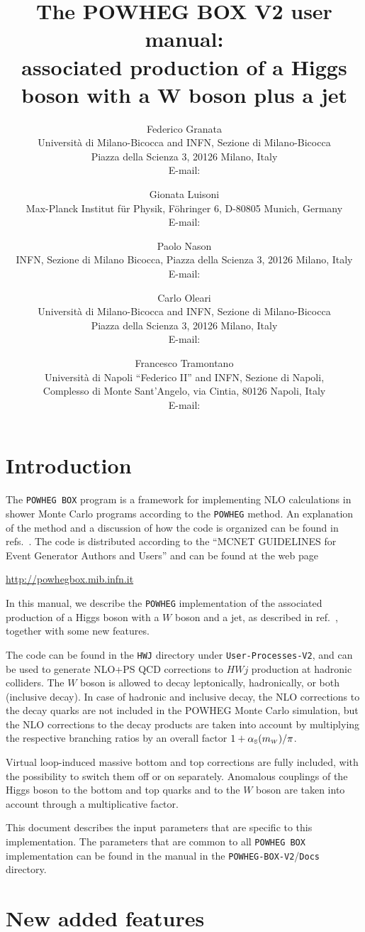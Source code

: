 \documentclass[paper]{JHEP3}
\title{The POWHEG BOX V2 user manual:\\
  associated production of a Higgs boson with a $\boldsymbol{W}$ boson plus a jet} \vfill
\author{Federico Granata\\
  Universit\`a di Milano-Bicocca and INFN, Sezione di Milano-Bicocca\\
  Piazza della Scienza 3, 20126 Milano, Italy\\
  E-mail: \email{federico.granata@mib.infn.it}}
\author{Gionata Luisoni\\ 
  Max-Planck Institut f{\"u}r Physik, F\"ohringer 6, D-80805 Munich, Germany\\
  E-mail: \email{luisonig@mpp.mpg.de}
}
\author{Paolo Nason\\
  INFN, Sezione di Milano Bicocca, Piazza della Scienza 3, 20126 Milano, Italy\\
  E-mail: \email{paolo.nason@mib.infn.it}
}
\author{Carlo Oleari\\
  Universit\`a di Milano-Bicocca and INFN, Sezione di Milano-Bicocca\\
  Piazza della Scienza 3, 20126 Milano, Italy\\
  E-mail: \email{carlo.oleari@mib.infn.it}}
\author{Francesco Tramontano\\
  Universit\`a di Napoli ``Federico II'' and INFN, Sezione di Napoli,\\
  Complesso di Monte Sant'Angelo, via Cintia, 80126 Napoli, Italy\\
  E-mail: \email{francesco.tramontano@na.infn.it}
}
\newcommand\sss{\mathchoice%
{\displaystyle}%
{\scriptstyle}%
{\scriptscriptstyle}%
{\scriptscriptstyle}%
}
\newcommand\as{\alpha_{\sss\rm S}}
\newcommand\POWHEG{{\tt POWHEG}}
\newcommand\POWHEGBOX{{\tt POWHEG BOX}}
\newcommand\POWHEGBOXV{{\tt POWHEG-BOX-V2}}
\newcommand\HWJ{{\tt HWJ}}
\begin{document}
\section{Introduction}

The \POWHEGBOX{} program is a framework for implementing NLO calculations in
shower Monte Carlo programs according to the \POWHEG{} method. An explanation
of the method and a discussion of how the code is organized can be found in
refs.~\cite{Nason:2004rx,Frixione:2007vw,Alioli:2010xd}.  The code is
distributed according to the ``MCNET GUIDELINES for Event Generator Authors
and Users'' and can be found at the web page
%
\begin{center}
 \url{http://powhegbox.mib.infn.it}
\end{center}
%
In this manual, we describe the \POWHEG{} implementation of the
associated production of a Higgs boson with a $W$ boson and a jet, as
described in ref.~\cite{Luisoni:2013cuh}, together with some new
features.

The code can be found in the \HWJ{} directory under {\tt User-Processes-V2},
and can be used to generate NLO+PS QCD corrections to $HWj$ production at
hadronic colliders.  The $W$ boson is allowed to decay leptonically,
hadronically, or both (inclusive decay).  In case of hadronic and
inclusive decay, the NLO corrections to the decay quarks are not included in
the POWHEG Monte Carlo simulation, but the NLO corrections to the decay
products are taken into account by multiplying the respective branching
ratios by an overall factor $1+\as(m_{\sss W})/\pi$.

Virtual loop-induced massive bottom and top corrections are fully included,
with the possibility to switch them off or on separately.  Anomalous
couplings of the Higgs boson to the bottom and top quarks and to the $W$
boson are taken into account through a multiplicative factor.

This document describes the input parameters that are specific to this
implementation. The parameters that are common to all \POWHEGBOX{}
implementation can be found in the manual in the \POWHEGBOXV{}/{\tt Docs}
directory.




\section{New added features}
\end{document}
